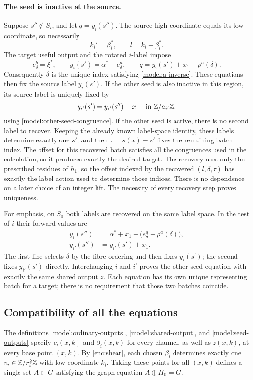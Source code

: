 \paragraph{The seed is inactive at the source.}
Suppose $s''\notin S_i$, and let $q=y_i(s'')$.  The source high
coordinate equals its low coordinate, so necessarily
\[
 k_i'=\beta_i^*,\qquad l=k_i-\beta_i^*.
\]
The target useful output and the rotated $i$-label impose
\[
 e_\delta^b=\xi^*,\qquad
 y_i(s')=\alpha^*-e_\delta^a,\qquad
 q=y_i(s')+x_1-\rho^a(\delta).
\]
Consequently $\delta$ is the unique index satisfying
\eqref{model:a-inverse}.  These equations then fix the source label
$y_i(s')$.  If the other seed is also inactive in this region, its
source label is uniquely fixed by
\[
 y_{i'}(s')=y_{i'}(s'')-x_1
 \quad\text{in }\mathbb Z/a_{i'}\mathbb Z,
\]
using \eqref{model:other-seed-congruence}.  If the other seed is
active, there is no second label to recover.  Keeping the already
known label-space identity, these labels determine exactly one
$s'$, and then $\tau=s(x)-s'$ fixes the remaining batch index.
The offset for this recovered batch satisfies all the congruences
used in the calculation, so it produces exactly the desired target.
The recovery uses only the prescribed residues of $h_1$, so the offset indexed by the recovered $(l,\delta,\tau)$ has exactly the label action used to determine those indices. There is no dependence on a later choice of an integer lift. The necessity of every recovery step proves uniqueness.

For emphasis, on $S_0$ both labels are recovered on the same label
space.  In the test of $i$ their forward values are
\[
 \begin{aligned}
 y_i(s'')&=\alpha^*+x_1-
                  \bigl(e_\delta^a+\rho^a(\delta)\bigr),\\
 y_{i'}(s'')&=y_{i'}(s')+x_1.
 \end{aligned}
\]
The first line selects $\delta$ by the fibre ordering and then fixes
$y_i(s')$; the second fixes $y_{i'}(s')$ directly.  Interchanging $i$
and $i'$ proves the other seed equation with exactly the same
shared output $z$.  Each equation has its own unique representing
batch for a target; there is no requirement that those two batches
coincide.

\subsection{Compatibility of all the equations}

The definitions \eqref{model:ordinary-outputs},
\eqref{model:shared-output}, and \eqref{model:seed-outputs} specify
$c_i(x,k)$ and $\beta_i(x,k)$ for every channel, as well as $z(x,k)$,
at every base point $(x,k)$.  By
\eqref{enc:shear}, each chosen $\beta_i$ determines exactly one
$v_i\in\mathbb Z/r_i^2\mathbb Z$ with low coordinate $k_i$.  Taking these points
for all $(x,k)$ defines a single set $A\subset G$ satisfying the graph
equation $A\oplus H_0=G$.

